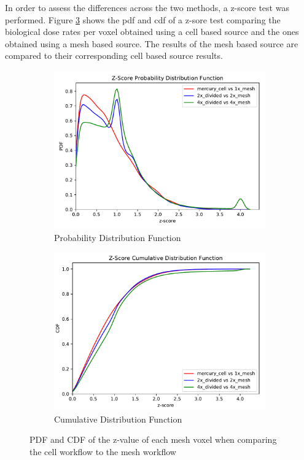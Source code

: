 %
In order to assess the differences across the two methods, a z-score test was
performed. Figure \ref{fig:1zscores} shows the \gls{pdf} and \gls{cdf} of a
z-sore test comparing the biological dose rates per voxel obtained using a
cell based source and the ones obtained using a mesh based source. The results
of the mesh based source are compared to their corresponding cell based source
results.
\begin{figure}[H]
	\begin{subfigure}[h]{1.0\textwidth}
		\centering
		\includegraphics[scale=0.85, trim={0cm 0cm 0cm 0.9cm},clip]{../figs/toy_p1/PDF_zscore_VPI_all.pdf}
		\caption{Probability Distribution Function}
		\label{fig:1VPI_pdf}
	\end{subfigure}
	\hfill
	\begin{subfigure}[h]{1.0\textwidth}
		\centering
		\includegraphics[scale=0.85, trim={0cm 0cm 0cm 0.8cm},clip]{../figs/toy_p1/CDF_zscore_VPI_all.pdf}
		\caption{Cumulative Distribution Function}
		\label{fig:1VPI_cdf}
	\end{subfigure}
	\caption{PDF and CDF of the z-value of each mesh voxel when comparing the cell workflow to the mesh workflow}
	\label{fig:1zscores}
\end{figure}


